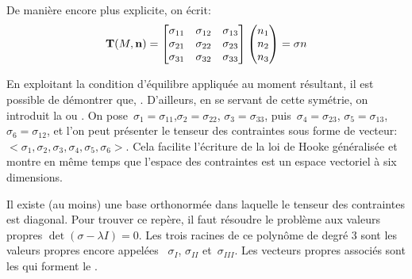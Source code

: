 \medskipvm
De manière encore plus explicite, on écrit:
\begin{equation}
\vect{T}(M,\vect{n}) =
\MM*{\sigma_{11}&\sigma_{12}&\sigma_{13}\\ \sigma_{21}&\sigma_{22}&\sigma_{23}\\
\sigma_{31}&\sigma_{32}&\sigma_{33}}
\VV*{n_1\\n_2\\n_3}
= \sigma n
\end{equation}

\medskip
En exploitant la condition d'équilibre appliquée au moment résultant, il est possible de démontrer que, .
\medskipvm
{} D'ailleurs, en se servant de cette symétrie, on introduit la  ou .
On pose~$\sigma_1=\sigma_{11}$,$\sigma_2=\sigma_{22}$, $\sigma_3=\sigma_{33}$, puis~$\sigma_4=\sigma_{23}$, $\sigma_5=\sigma_{13}$, $\sigma_6=\sigma_{12}$, et l'on peut présenter le tenseur des contraintes sous forme de vecteur: $<\sigma_1, \sigma_2, \sigma_3, \sigma_4, \sigma_5, \sigma_6>$.
Cela facilite l'écriture de la loi de Hooke généralisée et montre en même temps que l'espace des contraintes est un espace vectoriel à six dimensions.

\medskip
Il existe (au moins) une base orthonormée dans laquelle le tenseur des contraintes est diagonal. Pour trouver ce repère, il faut résoudre le problème aux valeurs propres $\det(\sigma-\lambda I)=0$. Les trois racines de ce polynôme de degré 3 sont les valeurs propres encore appelées ~$\sigma_I$, $\sigma_{II}$ et~$\sigma_{III}$. Les vecteurs propres associés sont les  qui forment le .

